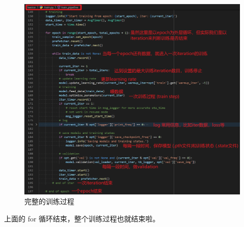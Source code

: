 \documentclass[../main.tex]{subfiles}
\begin{document}
\begin{enumerate}
          \begin{figure}[H]
              \begin{center}
                  \includegraphics[width=0.7\linewidth]{figures/getting_start_21.png}
                  \caption{完整的训练过程}
                  \label{fig:getting_start_19}
              \end{center}
              \vspace{-0.5cm}
          \end{figure}

          上面的 for 循环结束，整个训练过程也就结束啦。















\end{enumerate}
\end{document}
